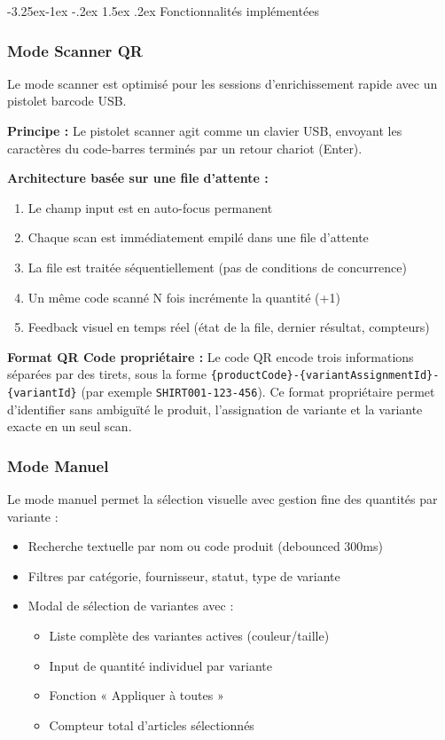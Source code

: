 \documentclass[12pt,a4paper,openany]{report}
\makeatletter
\renewcommand\subsection{\@startsection{subsection}{2}{\z@}%
  {-3.25ex\@plus -1ex \@minus -.2ex}%
  {1.5ex \@plus .2ex}%
  {\needspace{8\baselineskip}\normalfont\large\bfseries\color{primary!80!black}}}
\newcommand{\code}[1]{\texttt{#1}}
\makeatother
\begin{document}
\subsection{Fonctionnalités implémentées}

\subsubsection{Mode Scanner QR}

Le mode scanner est optimisé pour les sessions d'enrichissement rapide avec un pistolet barcode USB.

\textbf{Principe :} Le pistolet scanner agit comme un clavier USB, envoyant les caractères du code-barres terminés par un retour chariot (Enter).

\textbf{Architecture basée sur une file d'attente :}
\begin{enumerate}
  \item Le champ input est en auto-focus permanent
  \item Chaque scan est immédiatement empilé dans une file d'attente
  \item La file est traitée séquentiellement (pas de conditions de concurrence)
  \item Un même code scanné N fois incrémente la quantité (+1)
  \item Feedback visuel en temps réel (état de la file, dernier résultat, compteurs)
\end{enumerate}

\textbf{Format QR Code propriétaire :} Le code QR encode trois informations séparées par des tirets, sous la forme \code{\{productCode\}-\{variantAssignmentId\}-\{variantId\}} (par exemple \code{SHIRT001-123-456}). Ce format propriétaire permet d'identifier sans ambiguïté le produit, l'assignation de variante et la variante exacte en un seul scan.

\subsubsection{Mode Manuel}

Le mode manuel permet la sélection visuelle avec gestion fine des quantités par variante :

\begin{itemize}
  \item Recherche textuelle par nom ou code produit (debounced 300ms)
  \item Filtres par catégorie, fournisseur, statut, type de variante
  \item Modal de sélection de variantes avec :
    \begin{itemize}
      \item Liste complète des variantes actives (couleur/taille)
      \item Input de quantité individuel par variante
      \item Fonction « Appliquer à toutes »
      \item Compteur total d'articles sélectionnés
    \end{itemize}
\end{itemize}
\end{document}
